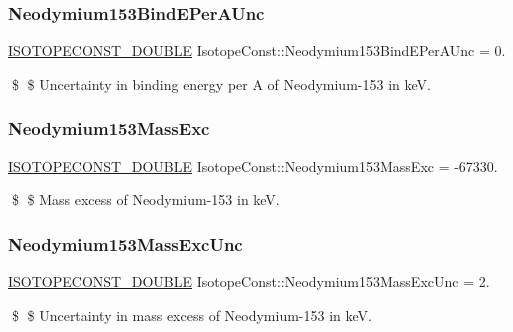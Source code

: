 \subsubsection{\texorpdfstring{Neodymium153\+Bind\+E\+Per\+A\+Unc}{Neodymium153BindEPerAUnc}}
{\footnotesize\ttfamily \mbox{\hyperlink{group___isotope_const-_macros_ga8f45a7272ce02c0b4c65c44636ed719a}{I\+S\+O\+T\+O\+P\+E\+C\+O\+N\+S\+T\+\_\+\+D\+O\+U\+B\+LE}} Isotope\+Const\+::\+Neodymium153\+Bind\+E\+Per\+A\+Unc = 0.}

\$ \$ Uncertainty in binding energy per A of Neodymium-\/153 in keV. \mbox{\label{group___isotope_const-_neodymium-_nd153_ga932415d4580b496c97521c49d73ab3f8}} 
\subsubsection{\texorpdfstring{Neodymium153\+Mass\+Exc}{Neodymium153MassExc}}
{\footnotesize\ttfamily \mbox{\hyperlink{group___isotope_const-_macros_ga8f45a7272ce02c0b4c65c44636ed719a}{I\+S\+O\+T\+O\+P\+E\+C\+O\+N\+S\+T\+\_\+\+D\+O\+U\+B\+LE}} Isotope\+Const\+::\+Neodymium153\+Mass\+Exc = -\/67330.}

\$ \$ Mass excess of Neodymium-\/153 in keV. \mbox{\label{group___isotope_const-_neodymium-_nd153_gab01b2ee5f8f62e34933721e3d9416c64}} 
\subsubsection{\texorpdfstring{Neodymium153\+Mass\+Exc\+Unc}{Neodymium153MassExcUnc}}
{\footnotesize\ttfamily \mbox{\hyperlink{group___isotope_const-_macros_ga8f45a7272ce02c0b4c65c44636ed719a}{I\+S\+O\+T\+O\+P\+E\+C\+O\+N\+S\+T\+\_\+\+D\+O\+U\+B\+LE}} Isotope\+Const\+::\+Neodymium153\+Mass\+Exc\+Unc = 2.}

\$ \$ Uncertainty in mass excess of Neodymium-\/153 in keV. \mbox{\label{group___isotope_const-_neodymium-_nd153_ga195de422e1fd3008017d90df0fb3a26e}} 
